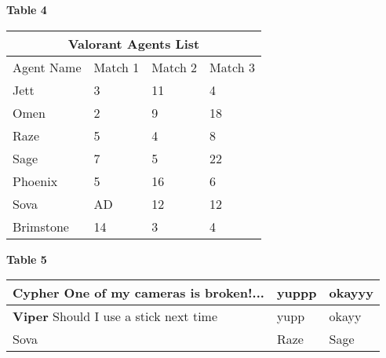 \documentclass{article}
\begin{document}
\begin{center}
\textbf{Table 4}
\end{center}


\begin{center}
\begin{tabular}{ |p{3cm}||p{3cm}|p{3cm}|p{3cm}| }
 \hline
 \multicolumn{4}{|c|}{Valorant Agents List} \\
 \hline
 Agent Name& Match 1 & Match 2 & Match 3\\
 \hline
 Jett   & 3    &11&   4\\
 Omen &   2  & 9   &18\\
 Raze &5 & 4&  8\\
 Sage    & 7 & 5&  22\\
 Phoenix&   5  & 16&6\\
 Sova& AD  & 12   &12\\
 Brimstone& 14 & 3&4\\
 \hline
\end{tabular}
\end{center}

\begin{center}
\textbf{Table 5}
\end{center}

\begin{center}
\begin{tabular}{ | m{5em}  m{1cm}| m{1cm} | } 
  \hline
    \textbf{Cypher} One of my cameras is broken!...
    
    & yuppp & okayyy\\ 
  \hline
   \textbf{Viper} Should I use a stick next time
  
   & yupp & okayy \\ 
  \hline
  Sova & Raze & Sage \\ 
  \hline
\end{tabular}
\end{center}
\end{document}

